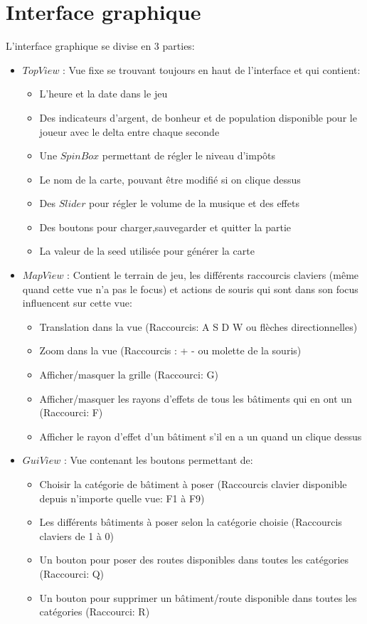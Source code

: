 \documentclass[a4paper,10pt,openany,oneside]{book}
\begin{document}
\section{Interface graphique}
L'interface graphique se divise en 3 parties:
\begin{itemize}
\item $TopView$ : Vue fixe se trouvant toujours en haut de l'interface et qui contient:
\begin{itemize}
\item L'heure et la date dans le jeu
\item Des indicateurs d'argent, de bonheur et de population disponible pour le joueur avec le delta entre chaque seconde
\item Une $SpinBox$ permettant de régler le niveau d'impôts
\item Le nom de la carte, pouvant être modifié si on clique dessus
\item Des $Slider$ pour régler le volume de la musique et des effets
\item Des boutons pour charger,sauvegarder et quitter la partie
\item La valeur de la seed utilisée pour générer la carte
\end{itemize}
\item $MapView$ : Contient le terrain de jeu, les différents raccourcis claviers (même quand cette vue n'a pas le focus) et actions de souris qui sont dans son focus influencent sur cette vue:
\begin{itemize}
\item Translation dans la vue (Raccourcis: A S D W ou flèches directionnelles)
\item Zoom dans la vue (Raccourcis : + - ou molette de la souris)
\item Afficher/masquer la grille (Raccourci: G)
\item Afficher/masquer les rayons d'effets de tous les bâtiments qui en ont un (Raccourci: F)
\item Afficher le rayon d'effet d'un bâtiment s'il en a un quand un clique dessus
\end{itemize}
\item $GuiView$ : Vue contenant les boutons permettant de:
\begin{itemize}
\item Choisir la catégorie de bâtiment à poser (Raccourcis clavier disponible depuis n'importe quelle vue: F1 à F9)
\item Les différents bâtiments à poser selon la catégorie choisie (Raccourcis claviers de 1 à 0)
\item Un bouton pour poser des routes disponibles dans toutes les catégories (Raccourci: Q)
\item Un bouton pour supprimer un bâtiment/route disponible dans toutes les catégories (Raccourci: R)
\end{itemize}
\end{itemize}
\end{document}
